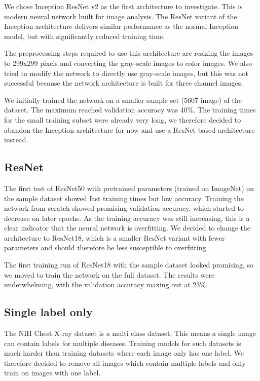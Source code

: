 We chose Inception ResNet v2 \cite{szegedy2017inception} as the first architecture to investigate. This is modern neural network built for image analysis.
The ResNet variant of the Inception architecture delivers similar performance as the normal Inception model, but with significantly reduced training time.

The preprocessing steps required to use this architecture are resizing the images to 299x299 pixels and converting the gray-scale images to color images.
We also tried to modify the network to directly use gray-scale images, but this was not successful because the network architecture is built for three channel images.

We initially trained the network on a smaller sample set (5607 image) of the dataset. The maximum reached validation accuracy was 40\%. The training times for the small training subset
were already very long, we therefore decided to abandon the Inception architecture for now and use a ResNet based architecture instead.

\subsection{ResNet}

The first test of ResNet50 \cite{he2016deep} with pretrained parameters (trained on ImageNet) on the sample dataset showed fast training times but low accuracy. Training the network from scratch showed promising validation accuracy, which started to decrease on later epochs. As the training accuracy was still increasing, this is a clear indicator that the neural network is overfitting. We decided to change the architecture to ResNet18, which is a smaller ResNet variant with fewer parameters and should therefore be less susceptible to overfitting.

The first training run of ResNet18 with the sample dataset looked promising, so we moved to train the network on the full dataset. The results were underwhelming, with the validation accuracy maxing out at 23\%.

\subsection{Single label only}
The NIH Chest X-ray dataset is a multi class dataset. This means a single image can contain labels for multiple diseases. Training models for such datasets is much harder than training datasets where each image only has one label. We therefore decided to remove all images which contain multiple labels and only train on images with one label.

